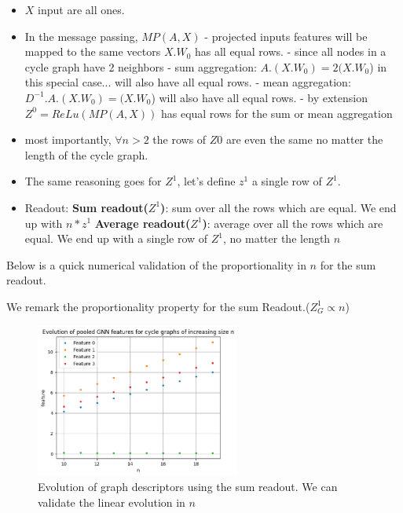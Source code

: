 \documentclass[a4paper]{article}
\begin{document}
\begin{itemize}
    \item $X$ input are all ones.
    \item In the message passing, $MP(A, X)$ 
        \subitem - projected inputs features will be mapped to the same vectors $X.W_{0}$ has all equal rows.
        \subitem - since all nodes in a cycle graph have 2 neighbors
        \subitem - sum aggregation: $A.(X.W_{0}) = 2(X.W_{0}$) in this special case... will also have all equal rows.
        \subitem - mean aggregation: $D^{-1}.A.(X.W_{0}) = (X.W_{0}$) will also have all equal rows.
        \subitem - by extension $Z^{0} = ReLu(MP(A, X))$ has equal rows for the sum or mean aggregation
    \item most importantly, $\forall{n} > 2$ the rows of $Z{0}$ are even the same no matter the length of the cycle graph.
    \item The same reasoning goes for $Z^{1}$, let's define $z^{1}$ a single row of $Z^{1}$.
    \item Readout:
        \subitem  \textbf{Sum readout($Z^1$)}: sum over all the rows which are equal. We end up with $n*z^{1}$
        \subitem  \textbf{Average readout($Z^1$)}: average over all the rows which are equal. We end up with a single row of $Z^{1}$, no matter the length $n$
\end{itemize}
Below is a quick numerical validation of the proportionality in $n$ for the sum readout.

\break

We remark the proportionality property for the sum Readout.($Z^{1}_{G} \propto{n}$)


\begin{figure}[ht]
    \centering
    \includegraphics[width=0.6\textwidth]{figures/features_evolution.png}
    \caption{Evolution of graph descriptors using the sum readout. We can validate the linear evolution in $n$ }
    \label{fig:node_embeddings}
\end{figure}
\end{document}
